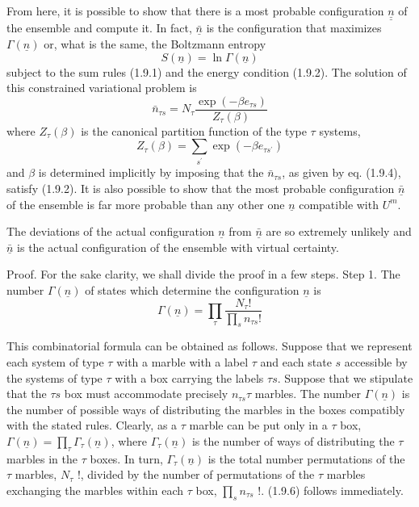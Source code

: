 \documentclass{article}
\begin{document}
From here, it is possible to show that there is a most probable configuration $\underline{\underline{n}}$ of the ensemble and compute it. In fact, $\underline{\bar{n}}$ is the configuration that maximizes $\Gamma(\underline{n})$ or, what is the same, the Boltzmann entropy
$$
\begin{equation*}
S(\underline{n})=\ln \Gamma(\underline{n}) \tag{1.9.3}
\end{equation*}
$$
subject to the sum rules (1.9.1) and the energy condition (1.9.2). The solution of this constrained variational problem is
$$
\begin{equation*}
\bar{n}_{\tau s}=N_{\tau} \frac{\exp \left(-\beta e_{\tau s}\right)}{Z_{\tau}(\beta)} \tag{1.9.4}
\end{equation*}
$$
where $Z_{\tau}(\beta)$ is the canonical partition function of the type $\tau$ systems,
$$
\begin{equation*}
Z_{\tau}(\beta)=\sum_{s^{\prime}} \exp \left(-\beta e_{\tau s^{\prime}}\right) \tag{1.9.5}
\end{equation*}
$$
and $\beta$ is determined implicitly by imposing that the $\bar{n}_{\tau s}$, as given by eq. (1.9.4), satisfy (1.9.2). It is also possible to show that the most probable configuration $\underline{\bar{n}}$ of the ensemble is far more probable than any other one $\underline{n}$ compatible with $U^{m}$.

The deviations of the actual configuration $\underline{n}$ from $\underline{\bar{n}}$ are so extremely unlikely and $\underline{\bar{n}}$ is the actual configuration of the ensemble with virtual certainty.

Proof. For the sake clarity, we shall divide the proof in a few steps.
Step 1. The number $\Gamma(\underline{n})$ of states which determine the configuration $\underline{n}$ is
$$
\begin{equation*}
\Gamma(\underline{n})=\prod_{\tau} \frac{N_{\tau}!}{\prod_{s} n_{\tau s}!} \tag{1.9.6}
\end{equation*}
$$

This combinatorial formula can be obtained as follows. Suppose that we represent each system of type $\tau$ with a marble with a label $\tau$ and each state $s$ accessible by the systems of type $\tau$ with a box carrying the labels $\tau s$. Suppose that we stipulate that the $\tau s$ box must accommodate precisely $n_{\tau s} \tau$ marbles. The number $\Gamma(\underline{n})$ is the number of possible ways of distributing the marbles in the boxes compatibly with the stated rules. Clearly, as a $\tau$ marble can be put only in a $\tau$ box, $\Gamma(\underline{n})=\prod_{\tau} \Gamma_{\tau}(\underline{n})$, where $\Gamma_{\tau}(\underline{n})$ is the number of ways of distributing the $\tau$ marbles in the $\tau$ boxes. In turn, $\Gamma_{\tau}(\underline{n})$ is the total number permutations of the $\tau$ marbles, $N_{\tau}$ !, divided by the number of permutations of the $\tau$ marbles exchanging the marbles within each $\tau$ box, $\prod_{s} n_{\tau s}$ !. (1.9.6) follows immediately.
\end{document}
